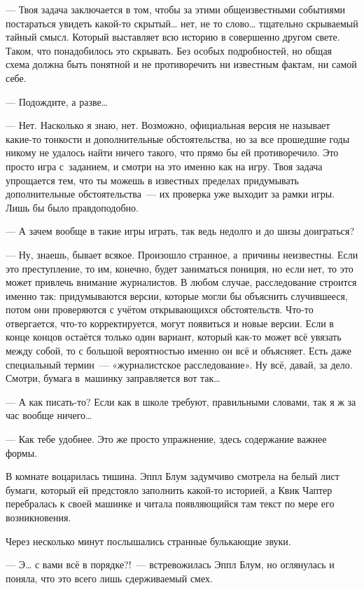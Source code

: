 \documentclass[fontsize=11pt,a5paper,titlepage=firstcover]{scrbook}
\begin{document}
--- Твоя задача заключается в том, чтобы за этими общеизвестными событиями постараться увидеть какой-то скрытый{\ldots} нет, не то слово{\ldots} тщательно скрываемый тайный смысл. Который выставляет всю историю в совершенно другом свете. Таком, что понадобилось это скрывать. Без особых подробностей, но общая схема должна быть понятной и не противоречить ни известным фактам, ни самой себе.

--- Подождите, а разве{\ldots}

--- Нет. Насколько я знаю, нет. Возможно, официальная версия не называет какие-то тонкости и дополнительные обстоятельства, но за все прошедшие годы никому не удалось найти ничего такого, что прямо бы ей противоречило. Это просто игра с~заданием, и смотри на это именно как на игру. Твоя задача упрощается тем, что ты можешь в известных пределах придумывать дополнительные обстоятельства~--- их проверка уже выходит за рамки игры. Лишь бы было правдоподобно.

--- А зачем вообще в такие игры играть, так ведь недолго и до шизы доиграться?

--- Ну, знаешь, бывает всякое. Произошло странное, а~причины неизвестны. Если это преступление, то им, конечно, будет заниматься пониция, но если нет, то это может привлечь внимание журналистов. В любом случае, расследование строится именно так: придумываются версии, которые могли бы объяснить случившееся, потом они проверяются с учётом открывающихся обстоятельств. Что-то отвергается, что-то корректируется, могут появиться и новые версии. Если в конце концов остаётся только один вариант, который как-то может всё увязать между собой, то с большой вероятностью именно он всё и объясняет. Есть даже специальный термин~--- «журналистское расследование». Ну всё, давай, за дело. Смотри, бумага в~машинку заправляется вот так{\ldots}

--- А как писать-то? Если как в школе требуют, правильными словами, так я ж за час вообще ничего{\ldots}

--- Как тебе удобнее. Это же просто упражнение, здесь содержание важнее формы.

В комнате воцарилась тишина. Эппл Блум задумчиво смотрела на белый лист бумаги, который ей предстояло заполнить какой-то историей, а Квик Чаптер перебралась к своей машинке и читала появляющийся там текст по мере его возникновения.

Через несколько минут послышались странные булькающие звуки.

--- Э{\ldots} с вами всё в порядке?!~--- встревожилась Эппл Блум, но оглянулась и поняла, что это всего лишь сдерживаемый смех.
\end{document}

